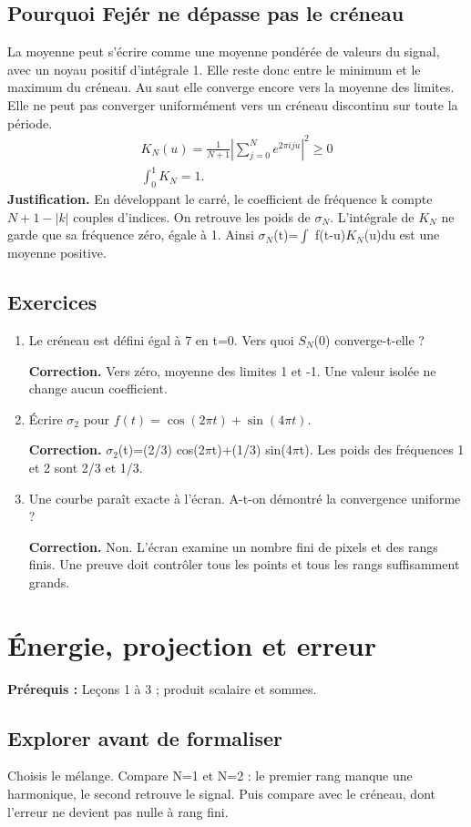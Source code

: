 \documentclass[11pt,a4paper]{article}
\begin{document}
\subsection{Pourquoi Fejér ne dépasse pas le créneau}
La moyenne peut s’écrire comme une moyenne pondérée de valeurs du signal, avec un noyau positif d’intégrale 1. Elle reste donc entre le minimum et le maximum du créneau. Au saut elle converge encore vers la moyenne des limites. Elle ne peut pas converger uniformément vers un créneau discontinu sur toute la période.
\[\begin{gathered}K_N(u)=\frac1{N+1}\left|\sum_{j=0}^{N}e^{2\pi iju}\right|^2\ge0\\\int_0^1K_N=1.\end{gathered}\]
\textbf{Justification.} En développant le carré, le coefficient de fréquence k compte $N+1-|k|$ couples d’indices. On retrouve les poids de $\sigma_N$. L’intégrale de $K_N$ ne garde que sa fréquence zéro, égale à 1. Ainsi $\sigma_N$(t)=$\int$ f(t-u)$K_N$(u)du est une moyenne positive.
\subsection*{Exercices}\begin{enumerate}
\item Le créneau est défini égal à 7 en t=0. Vers quoi $S_N$(0) converge-t-elle ?
\par\textbf{Correction.} Vers zéro, moyenne des limites 1 et -1. Une valeur isolée ne change aucun coefficient.
\item Écrire $\sigma_2$ pour $f(t)=\cos(2\pi t)+\sin(4\pi t)$.
\par\textbf{Correction.} $\sigma_2$(t)=(2/3) cos(2$\pi$t)+(1/3) sin(4$\pi$t). Les poids des fréquences 1 et 2 sont 2/3 et 1/3.
\item Une courbe paraît exacte à l’écran. A-t-on démontré la convergence uniforme ?
\par\textbf{Correction.} Non. L’écran examine un nombre fini de pixels et des rangs finis. Une preuve doit contrôler tous les points et tous les rangs suffisamment grands.
\end{enumerate}
\clearpage
\section{Énergie, projection et erreur}
\textbf{Prérequis :} Leçons 1 à 3 ; produit scalaire et sommes.
\subsection*{Explorer avant de formaliser}Choisis le mélange. Compare N=1 et N=2 : le premier rang manque une harmonique, le second retrouve le signal. Puis compare avec le créneau, dont l’erreur ne devient pas nulle à rang fini.
\end{document}
